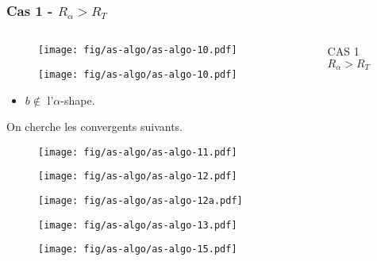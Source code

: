 \documentclass{beamer}
\begin{document}
\begin{frame}
\frametitle{Cas 1 - $R_{\alpha} > R_T$}
 
  \begin{columns}[t]
   \begin{column}{7cm}
      {
        \begin{figure}[H]
          \centering
          \texttt{[image: fig/as-algo/as-algo-10.pdf]}
      \end{figure}
      }
      {
        \begin{figure}[H]
          \centering
          \texttt{[image: fig/as-algo/as-algo-10.pdf]}
       \end{figure}
      }
      {
          \begin{block}{}
            \begin{itemize}
              \item $b \notin$ l'$\alpha$-shape.
            \end{itemize}
          \alert{On cherche les convergents suivants.}
        \end{block}
      }   
      {
        \begin{figure}[H]
          \centering
          \texttt{[image: fig/as-algo/as-algo-11.pdf]}
      \end{figure}
      }
      {
        \begin{figure}[H]
          \centering
          \texttt{[image: fig/as-algo/as-algo-12.pdf]}
      \end{figure}
      }
      {
        \begin{figure}[h!]
          \centering
          \texttt{[image: fig/as-algo/as-algo-12a.pdf]}
      \end{figure}
      }
      {
        \begin{figure}[h!]
          \centering
          \texttt{[image: fig/as-algo/as-algo-13.pdf]}
      \end{figure}
      }
      {
        \begin{figure}[h!]
          \centering
          \texttt{[image: fig/as-algo/as-algo-15.pdf]}
      \end{figure}
      }
   \end{column}
    \begin{column}{3cm}
      \begin{block}{}
        {
          \alert{CAS 1}\\
          \alert{$R_{\alpha} > R_T$}
          
}
\end{block}
\end{column}
\end{columns}
\end{frame}
\end{document}
